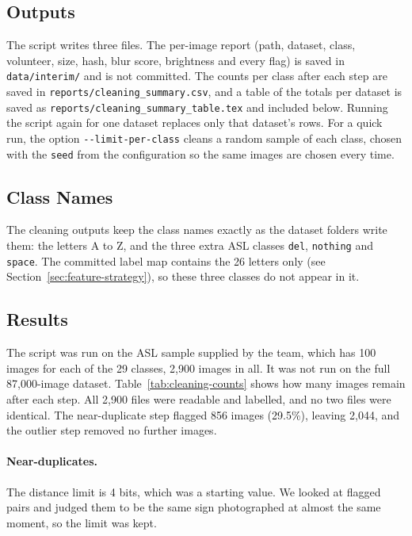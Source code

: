 \subsection{Outputs}

The script writes three files. The per-image report (path, dataset, class, volunteer, size, hash, blur score, brightness and every flag) is saved in \texttt{data/interim/} and is not committed. The counts per class after each step are saved in \texttt{reports/cleaning\_summary.csv}, and a table of the totals per dataset is saved as \texttt{reports/cleaning\_summary\_table.tex} and included below. Running the script again for one dataset replaces only that dataset's rows. For a quick run, the option \texttt{-{}-limit-per-class} cleans a random sample of each class, chosen with the \texttt{seed} from the configuration so the same images are chosen every time.

\subsection{Class Names}

The cleaning outputs keep the class names exactly as the dataset folders write them: the letters A to Z, and the three extra ASL classes \texttt{del}, \texttt{nothing} and \texttt{space}. The committed label map contains the 26 letters only (see Section~\ref{sec:feature-strategy}), so these three classes do not appear in it.

\subsection{Results}



The script was run on the ASL sample supplied by the team, which has 100 images for each of the 29 classes, 2{,}900 images in all. It was not run on the full 87{,}000-image dataset. Table~\ref{tab:cleaning-counts} shows how many images remain after each step. All 2{,}900 files were readable and labelled, and no two files were identical. The near-duplicate step flagged 856 images (29.5\%), leaving 2{,}044, and the outlier step removed no further images.

\paragraph{Near-duplicates.} The distance limit is 4 bits, which was a starting value. We looked at flagged pairs and judged them to be the same sign photographed at almost the same moment, so the limit was kept.

